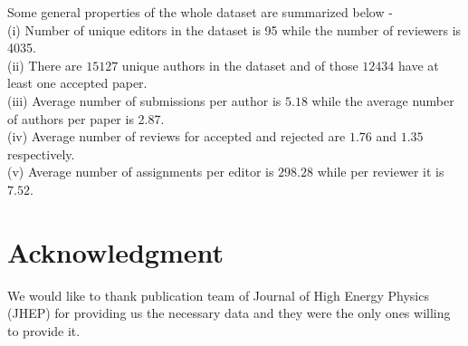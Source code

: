 Some general properties of the whole dataset are summarized below - \\
(i) Number of unique editors in the dataset is 95 while the number of reviewers is 4035.\\ 
(ii) There are $15127$ unique authors in the dataset and of those $12434$ have at least one accepted paper.\\
(iii) Average number of submissions per author is $5.18$ while the average number of authors per paper is 2.87.\\
(iv) Average number of reviews for accepted and rejected are $1.76$ and $1.35$ respectively.\\
(v) Average number of assignments per editor is $298.28$ while per reviewer it is $7.52$.\\

%
\fi










%


%

%
\section*{Acknowledgment}
We would like to thank publication team of Journal of High Energy Physics (JHEP) for providing us the necessary data and they were the only ones willing to provide it.

%
%

